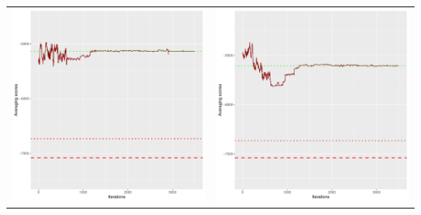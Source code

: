 \documentclass[]{scrartcl}
\begin{document}
\begin{table}[h!]
\begin{tabular}{cc}
\includegraphics[scale = 0.4]{./figs/alarm/v4/30/avgBoundsEvolution-3502.pdf} & 
\includegraphics[scale = 0.4]{./figs/alarm/v4/50/avgBoundsEvolution-3502.pdf} \\

\end{tabular}
\end{table}
\end{document}
